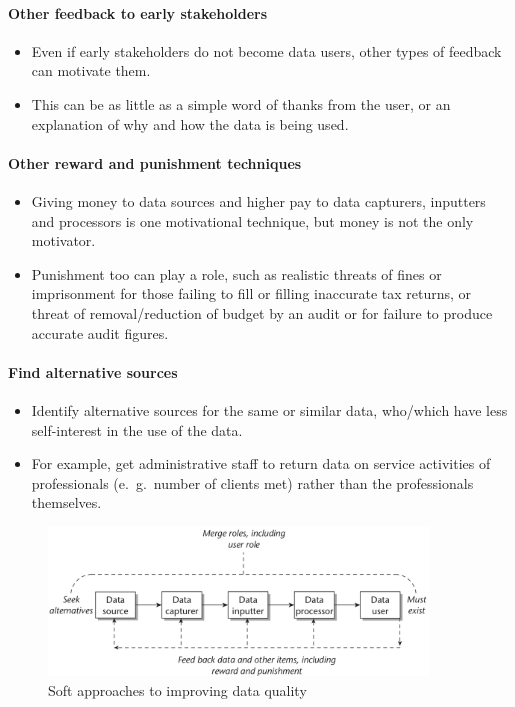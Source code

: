 \paragraph*{Other feedback to early stakeholders}
\begin{itemize}
	\item Even if early stakeholders do not become data	users, other types of feedback can motivate them. 
	\item This can be as little as a simple word of thanks from the user, or an explanation of why and how the data	is being used.
\end{itemize}

\paragraph*{Other reward and punishment techniques}
\begin{itemize}
	\item Giving money to data sources and higher pay to data capturers, inputters and	processors is one motivational technique, but money is not the only motivator.
	\item Punishment too can play a role, such as realistic threats of fines or imprisonment for those failing to fill or filling inaccurate tax returns, or threat of removal/reduction of budget by an audit or for failure to produce accurate audit figures.
\end{itemize}

\paragraph*{Find alternative sources}
\begin{itemize}
	\item Identify alternative sources for the same or similar data, who/which have less self-interest in the use of the data.
	\item For example, get administrative staff to return data on service activities of professionals (e.\ g.\ number of clients met) rather than the professionals themselves.
\end{itemize}


\begin{figure}[th!]
	\centering
	\includegraphics[width=0.9\textwidth]{graphics/soft-approach-data-quality}
	\caption{Soft approaches to improving data quality}
	\label{fig:soft-approach-data-quality}
\end{figure}



